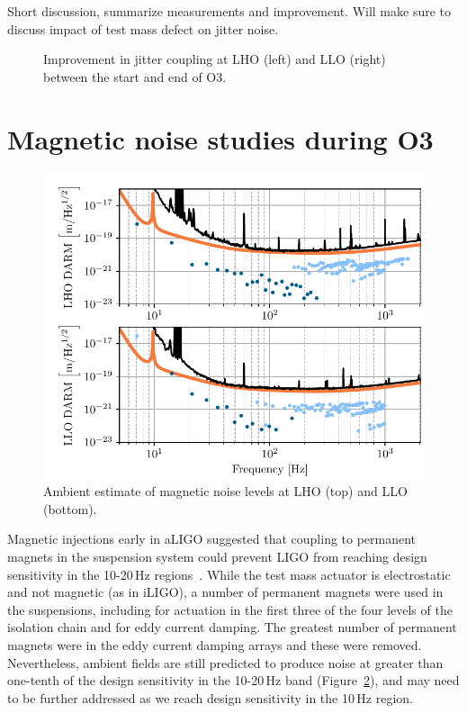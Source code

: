 {\color{red}
Short discussion, summarize measurements and improvement.
Will make sure to discuss impact of test mass defect on jitter noise.}

\begin{figure}
	\centering
	\caption{Improvement in jitter coupling at LHO (left) and LLO (right) between the start and end of O3.}
	\label{fig:vib-jitter}
\end{figure}

\section{Magnetic noise studies during O3}\label{sec:mag}

\begin{figure}[h]
	\centering
	\includegraphics[width=\textwidth]{figures/noise-studies/mag-ambient.pdf}
	\caption{
		Ambient estimate of magnetic noise levels at LHO (top) and LLO (bottom).}
	\label{fig:mag-ambient}
\end{figure}

Magnetic injections early in \ac{aLIGO} suggested that coupling to permanent magnets in the suspension system  could prevent \ac{LIGO} from reaching design sensitivity in the 10-20\,Hz regions~\citep{Schofield_2013}.
While the test mass actuator is electrostatic and not magnetic (as in \ac{iLIGO}), a number of permanent magnets were used in the suspensions, including for actuation in the first three of the four levels of the isolation chain and for eddy current damping.
The greatest number of permanent magnets were in the eddy current damping arrays and these were removed.
Nevertheless, ambient fields are still predicted to produce noise at greater than one-tenth of the design sensitivity in the 10-20\,Hz band (Figure~\ref{fig:mag-ambient}), and may need to be further addressed as we reach design sensitivity in the 10\,Hz region.

